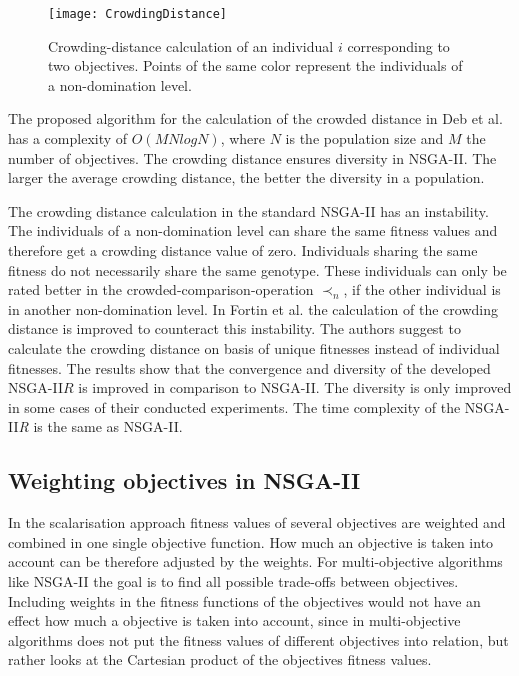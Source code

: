     \begin{figure}
        \centering
        \texttt{[image: CrowdingDistance]}
        \caption{Crowding-distance calculation of an individual $i$ corresponding to two objectives. Points of the same color represent the individuals of a non-domination level.}
        \label{fig:crowdingDistance}
    \end{figure}
    
    The proposed algorithm for the calculation of the crowded distance in Deb et al.\cite{Deb:2002} has a complexity of $O(MN logN)$, where $N$ is the population size and $M$ the number of objectives. The crowding distance ensures diversity in NSGA-II. The larger the average crowding distance, the better the diversity in a population.
    
    
    The crowding distance calculation in the standard NSGA-II\cite{Deb:2002} has an instability. The individuals of a non-domination level can share the same fitness values and therefore get a crowding distance value of zero. Individuals sharing the same fitness do not necessarily share the same genotype. These individuals can only be rated better in the crowded-comparison-operation $\prec_n$, if the other individual is in another non-domination level. In Fortin et al.\cite{Fortin:2013} the calculation of the crowding distance is improved to counteract this instability. The authors suggest to calculate the crowding distance on basis of unique fitnesses instead of individual fitnesses. The results show that the convergence and diversity of the developed NSGA-II$R$ is improved in comparison to NSGA-II. The diversity is only improved in some cases of their conducted experiments. The time complexity of the NSGA-II\textit{R} is the same as NSGA-II.
    
    \subsection{Weighting objectives in NSGA-II}
    In the scalarisation approach fitness values of several objectives are weighted and combined in one single objective function. How much an objective is taken into account can be therefore adjusted by the weights. For multi-objective algorithms like NSGA-II the goal is to find all possible trade-offs between objectives. Including weights in the fitness functions of the objectives would not have an effect how much a objective is taken into account, since in multi-objective algorithms does not put the fitness values of different objectives into relation, but rather looks at the Cartesian product of the objectives fitness values.
    
